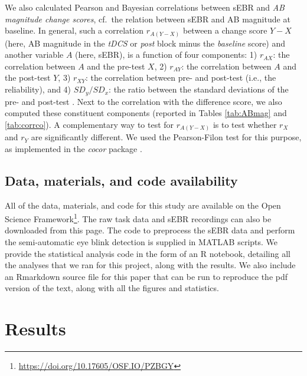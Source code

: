 \documentclass[11pt,english,]{memoir}
\let\rmarkdownfootnote\footnote%
\def\footnote{\protect\rmarkdownfootnote}
\renewcommand{\href}[2]{#2\footnote{\url{#1}}} %
\begin{document}
We also calculated Pearson and Bayesian correlations between sEBR and \emph{AB magnitude change scores}, cf.~the relation between sEBR and AB magnitude at baseline. In general, such a correlation \(r_{A(Y-X)}\) between a change score \(Y-X\) (here, AB magnitude in the \emph{tDCS} or \emph{post} block minus the \emph{baseline} score) and another variable \(A\) (here, sEBR), is a function of four components: 1) \(r_{AX}\): the correlation between \(A\) and the pre-test \(X\), 2) \(r_{AY}\): the correlation between \(A\) and the post-test \(Y\), 3) \(r_{XY}\): the correlation between pre- and post-test (i.e., the reliability), and 4) \(SD_y / SD_x\): the ratio between the standard deviations of the pre- and post-test \autocites{Gardner1987}{Griffin1999}. Next to the correlation with the difference score, we also computed these constituent components (reported in Tables \ref{tab:ABmag} and \ref{tab:corrco}). A complementary way to test for \(r_{A(Y-X)}\) is to test whether \(r_X\) and \(r_Y\) are significantly different. We used the Pearson-Filon test \autocite*{Pearson1898} for this purpose, as implemented in the \emph{cocor} package \autocite[Version NA;][]{R-cocor}.

\hypertarget{data-materials-and-code-availability-2}{%
\subsection{Data, materials, and code availability}\label{data-materials-and-code-availability-2}}

All of the data, materials, and code for this study are available on the \href{https://doi.org/10.17605/OSF.IO/PZBGY}{Open Science Framework}. The raw task data and sEBR recordings can also be downloaded from this page. The code to preprocess the sEBR data and perform the semi-automatic eye blink detection \autocites[cf.][]{Slagter2013}{Kruis2016} is supplied in MATLAB scripts. We provide the statistical analysis code in the form of an R notebook, detailing all the analyses that we ran for this project, along with the results. We also include an Rmarkdown \autocite{Xie2018} source file for this paper that can be run to reproduce the pdf version of the text, along with all the figures and statistics.

\hypertarget{AB_sEBR-results}{%
\section{Results}\label{AB_sEBR-results}}
\end{document}

